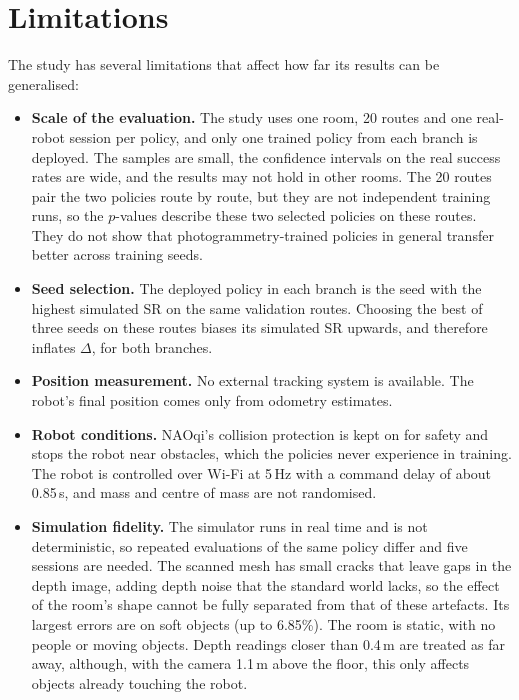 \section{Limitations}\label{sec:limitations}
The study has several limitations that affect how far its results can be generalised:
\begin{itemize}
\item \textbf{Scale of the evaluation.} The study uses one room, 20 routes and one real-robot
session per policy, and only one trained policy from each branch is deployed. The samples are small,
the confidence intervals on the real success rates are wide, and the results may not hold in other
rooms. The 20 routes pair the two policies route by route, but they are not independent training
runs, so the $p$-values describe these two selected policies on these routes. They do not show that
photogrammetry-trained policies in general transfer better across training seeds.
\item \textbf{Seed selection.} The deployed policy in each branch is the seed with the highest
simulated SR on the same validation routes. Choosing the best of three seeds on these routes biases
its simulated SR upwards, and therefore inflates $\Delta$, for both branches.
\item \textbf{Position measurement.} No external tracking system is available. The robot's final
position comes only from odometry estimates.
\item \textbf{Robot conditions.} NAOqi's collision protection is kept on for safety and stops the
robot near obstacles, which the policies never experience in training. The robot is controlled over
Wi-Fi at 5\,Hz with a command delay of about 0.85\,s, and mass and centre of mass are not
randomised.
\item \textbf{Simulation fidelity.} The simulator runs in real time and is not deterministic, so
repeated evaluations of the same policy differ and five sessions are needed. The scanned mesh has
small cracks that leave gaps in the depth image, adding depth noise that the standard world lacks,
so the effect of the room's shape cannot be fully separated from that of these artefacts. Its
largest errors are on soft objects (up to 6.85\%). The room is static, with no people or moving
objects. Depth readings closer than 0.4\,m are treated as far away, although, with the camera 1.1\,m
above the floor, this only affects objects already touching the robot.
\end{itemize}
